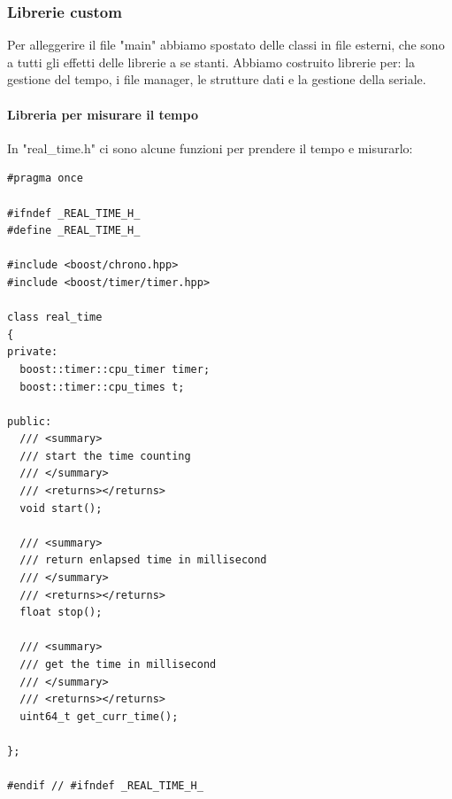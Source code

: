 \documentclass[10pt,a4paper]{article}
\begin{document}
\subsubsection{Librerie custom}
Per alleggerire il file "main" abbiamo spostato delle classi in file esterni, che sono a tutti gli effetti delle librerie a se stanti. Abbiamo costruito librerie per: la gestione del tempo, i file manager, le strutture dati e la gestione della seriale.
%
%
\paragraph{Libreria per misurare il tempo}
In "real\_time.h" ci sono alcune funzioni per prendere il tempo e misurarlo:
\begin{lstlisting}[style=mycpp, caption=real\_time.h, captionpos=b]
#pragma once

#ifndef _REAL_TIME_H_
#define _REAL_TIME_H_

#include <boost/chrono.hpp>
#include <boost/timer/timer.hpp>

class real_time
{
private:
  boost::timer::cpu_timer timer;
  boost::timer::cpu_times t;

public:
  /// <summary>
  /// start the time counting
  /// </summary>
  /// <returns></returns>
  void start();

  /// <summary>
  /// return enlapsed time in millisecond
  /// </summary>
  /// <returns></returns>
  float stop();

  /// <summary>
  /// get the time in millisecond
  /// </summary>
  /// <returns></returns>
  uint64_t get_curr_time();

};

#endif // #ifndef _REAL_TIME_H_
\end{lstlisting}
%
%
\end{document}
